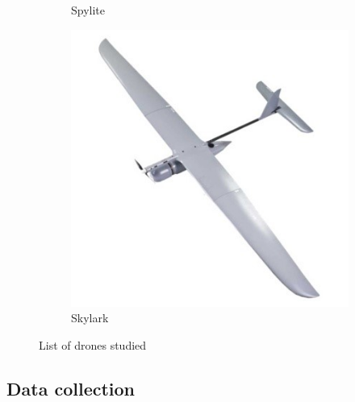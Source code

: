 \documentclass[12 pt]{article}
\begin{document}
\begin{figure}
\begin{subfigure}{.4\textwidth}
        \caption{Spylite}
        \label{Spylite}
    \end{subfigure}
    \centering
    \begin{subfigure}{.4\textwidth}
        \centering
        \includegraphics[width = 0.9\linewidth]{Aircraft pics/Skylark.jpg}
        \caption{Skylark}
        \label{Skylark}
    \end{subfigure}
    \caption{List of drones studied}
    \label{Drone pictures}
\end{figure}


\subsection{Data collection}
\end{document}
